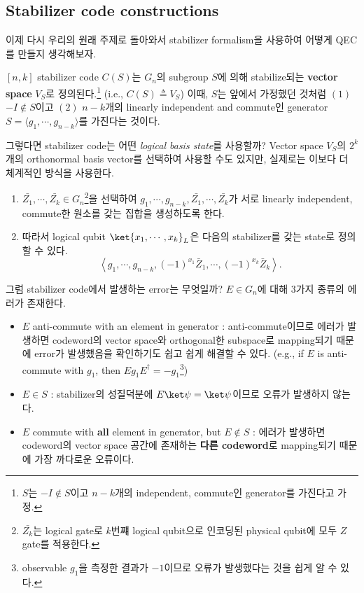 \subsection{Stabilizer code constructions}
이제 다시 우리의 원래 주제로 돌아와서 stabilizer formalism을 사용하여 어떻게 QEC를 만들지 생각해보자.

$[n, k]$ stabilizer code $C(S)$는 $G_n$의 subgroup $S$에 의해 stabilize되는 \textbf{vector space} $V_S$로 정의된다.\footnote{$S$는 $-I \notin S$이고 $n-k$개의 independent, commute인 generator를 가진다고 가정.} (i.e., $C(S) \triangleq V_S$)
이때, $S$는 앞에서 가정했던 것처럼 $(1)$ $-I \not \in S$이고 $(2)$ $n-k$개의 linearly independent and commute인 generator $S = \langle g_1, \cdots, g_{n-k} \rangle$를 가진다는 것이다. 

그렇다면 stabilizer code는 어떤 \textit{logical basis state}를 사용할까? Vector space $V_S$의 $2^k$개의 orthonormal basis vector를 선택하여 사용할 수도 있지만, 실제로는 이보다 더 체계적인 방식을 사용한다.
\begin{enumerate}
    \item $\bar{Z_1}, \cdots, \bar{Z_k} \in G_n$\footnote{$\bar{Z_k}$는 logical gate로 $k$번쨰 logical qubit으로 인코딩된 physical qubit에 모두 $Z$ gate를 적용한다.}을 선택하여 $g_1, \cdots, g_{n-k}, \bar{Z_1}, \cdots, \bar{Z_k}$가 서로 linearly independent, commute한 원소를 갖는 집합을 생성하도록 한다.
    \item 따라서 logical qubit $\ket{x_1, \cdots, x_k}_L$은 다음의 stabilizer를 갖는 state로 정의할 수 있다.
    \begin{equation*}
        \left\langle g_1, \cdots, g_{n-k},(-1)^{x_1} \bar{Z}_1, \cdots,(-1)^{x_k} \bar{Z}_k\right\rangle .
    \end{equation*}
\end{enumerate}

그럼 stabilizer code에서 발생하는 error는 무엇일까? $E \in G_n$에 대해 3가지 종류의 에러가 존재한다.
\begin{itemize}
    \item $E$ anti-commute with an element in generator : anti-commute이므로 에러가 발생하면 codeword의 vector space와 orthogonal한 subspace로 mapping되기 때문에 error가 발생했음을 확인하기도 쉽고 쉽게 해결할 수 있다. (e.g., if $E$ is anti-commute with $g_1$, then $Eg_{1}E^\dagger = -g_{1}$\footnote{observable $g_1$을 측정한 결과가 $-1$이므로 오류가 발생했다는 것을 쉽게 알 수 있다.})
    \item $E \in S$ : stabilizer의 성질덕분에 $E \ket \psi = \ket \psi$이므로 오류가 발생하지 않는다.
    \item $E$ commute with \textbf{all} element in generator, but $E \notin S$ : 에러가 발생하면 codeword의 vector space 공간에 존재하는 \textbf{다른 codeword}로 mapping되기 때문에 가장 까다로운 오류이다.
\end{itemize}

